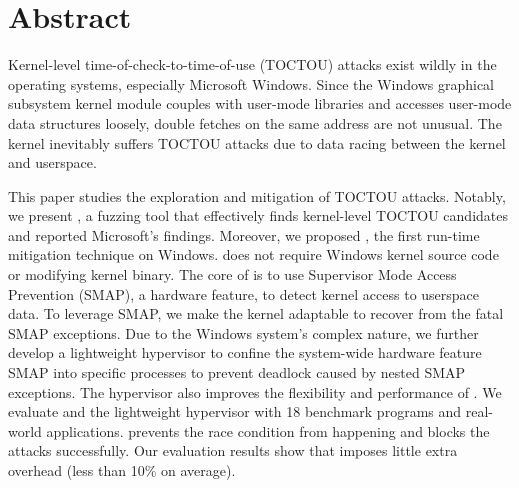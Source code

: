 \section{Abstract}


Kernel-level time-of-check-to-time-of-use (TOCTOU) attacks exist wildly in the operating systems, especially Microsoft Windows. Since the Windows graphical subsystem kernel module couples with user-mode libraries and accesses user-mode data structures loosely, double fetches on the same address are not unusual. The kernel inevitably suffers TOCTOU attacks due to data racing between the kernel and userspace.

This paper studies the exploration and mitigation of TOCTOU attacks. Notably, we present \toolname, a fuzzing tool that effectively finds kernel-level TOCTOU candidates and reported Microsoft's findings. Moreover, we proposed \name, the first run-time mitigation technique on Windows. \name does not require Windows kernel source code or modifying kernel binary. The core of \name is to use Supervisor Mode Access Prevention (SMAP), a hardware feature, to detect kernel access to userspace data. To leverage SMAP, we make the kernel adaptable to recover from the fatal SMAP exceptions. Due to the Windows system's complex nature, we further develop a lightweight hypervisor to confine the system-wide hardware feature SMAP into specific processes to prevent deadlock caused by nested SMAP exceptions. The hypervisor also improves the flexibility and performance of \name. We evaluate \name and the lightweight hypervisor with 18 benchmark programs and real-world applications. \name prevents the race condition from happening and blocks the attacks successfully. Our evaluation results show that \name imposes little extra overhead (less than 10\% on average).

